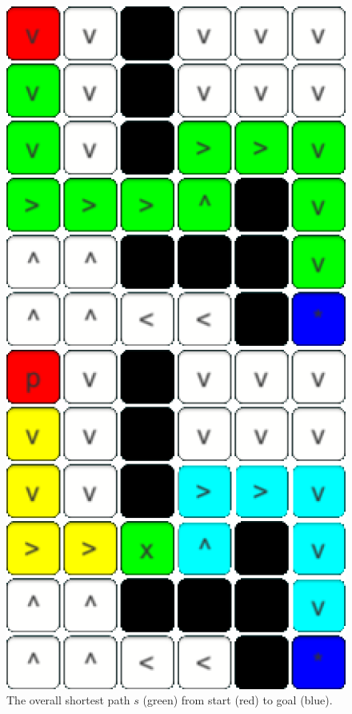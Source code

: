 \documentclass[conference]{IEEEtran}
\begin{document}
\begin{figure}[h]
\centering
\begin{minipage}[t]{0.3\linewidth}
\centering
\includegraphics[width=1\textwidth]{images/OptimalSubstructure/start.png}
\caption{The overall shortest path $s$ (green) from start (red) to goal (blue).}
\end{minipage}
\hfill
\begin{minipage}[t]{0.3\linewidth}
\centering
\includegraphics[width=1\textwidth]{images/OptimalSubstructure/first.png}

\end{minipage}
\end{figure}
\end{document}

